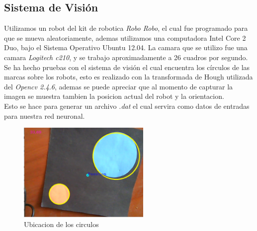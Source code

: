 \documentclass[conference]{IEEEtran}
\begin{document}
\subsection{Sistema de Visi\'on}
Utilizamos un robot del kit de robotica \textit{Robo Robo},  el cual fue programado para que se mueva aleatoriamente, ademas utilizamos una computadora Intel Core 2 Duo, bajo el Sistema Operativo Ubuntu 12.04. La camara que se utilizo fue una camara \textit{Logitech c210}, y se trabajo aproximadamente a 26 cuadros por segundo.\\
Se ha hecho pruebas con el sistema de visi\'on el cual encuentra los c\'irculos de las marcas sobre los robots, esto es realizado con la transformada de Hough utilizada del \textit{Opencv 2.4.6}, ademas se puede apreciar que al momento de capturar la imagen se muestra tambien la posicion actual del robot y la orientacion.\\
 Esto se hace para generar un archivo \textit{.dat} el cual servira como datos de entradas para nuestra red neuronal.
\begin{figure}
	\centering
	\includegraphics[width=2.5in]{visi.pdf}
	
	\caption{Ubicacion de los circulos}
	\label{fig_mar}
\end{figure}
\end{document}
